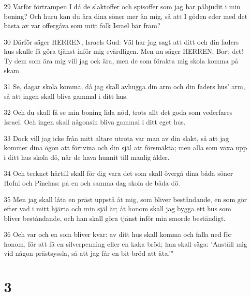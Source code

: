 \par 29 Varför förtrampen I då de slaktoffer och spisoffer som jag har påbjudit i min boning? Och huru kan du ära dina söner mer än mig, så att I göden eder med det bästa av var offergåva som mitt folk Israel bär fram?
\par 30 Därför säger HERREN, Israels Gud: Väl har jag sagt att ditt och din faders hus skulle få göra tjänst inför mig evärdligen. Men nu säger HERREN: Bort det! Ty dem som ära mig vill jag ock ära, men de som förakta mig skola komma på skam.
\par 31 Se, dagar skola komma, då jag skall avhugga din arm och din faders hus' arm, så att ingen skall bliva gammal i ditt hus.
\par 32 Och du skall få se min boning lida nöd, trots allt det goda som vederfares Israel. Och ingen skall någonsin bliva gammal i ditt eget hus.
\par 33 Dock vill jag icke från mitt altare utrota var man av din slakt, så att jag kommer dina ögon att förtvina och din själ att försmäkta; men alla som växa upp i ditt hus skola dö, när de hava hunnit till manlig ålder.
\par 34 Och tecknet härtill skall för dig vara det som skall övergå dina båda söner Hofni och Pinehas: på en och samma dag skola de båda dö.
\par 35 Men jag skall låta en präst uppstå åt mig, som bliver beståndande, en som gör efter vad i mitt hjärta och min själ är; åt honom skall jag bygga ett hus som bliver beståndande, och han skall göra tjänst inför min smorde beständigt.
\par 36 Och var och en som bliver kvar: av ditt hus skall komma och falla ned för honom, för att få en silverpenning eller en kaka bröd; han skall säga: 'Anställ mig vid någon prästsyssla, så att jag får en bit bröd att äta.'"

\chapter{3}

